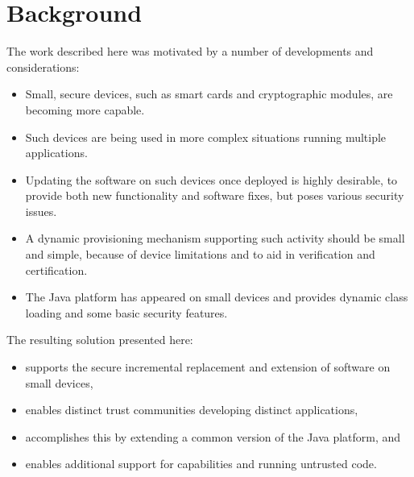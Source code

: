 \documentclass{llncs}
\begin{document}
\maketitle              %

\begin{abstract}
As small, secure devices become more powerful and more wide spread, it has become desirable
to support the dynamic provisioning and updating of multiple applications on such devices. This
paper presents a simple mechanism for performing such provisioning and updating, even if the
applications are mutually distrustful. The mechanism extends CLDC Java\texttrademark technology
with a classfile attribute that carries the certificates necessary to enable the added security.
\end{abstract}
%
\section{Background}
%
The work described here was motivated by a number of developments and considerations:
\begin{itemize}
  \item Small, secure devices, such as smart cards and cryptographic modules, are becoming more capable.
  \item Such devices are being used in more complex situations running multiple applications.
  \item Updating the software on such devices once deployed is highly desirable, to provide both new
  functionality and software fixes, but poses various security issues.
  \item A dynamic provisioning mechanism supporting such activity should be small and simple,
  because of device limitations and to aid in verification and certification.
  \item The Java platform has appeared on small devices and provides dynamic class loading and
  some basic security features.
\end{itemize}
The resulting solution presented here:

\begin{itemize}
  \item supports the secure incremental replacement and extension of software
  on small devices,
	\item  enables distinct trust communities developing
	distinct applications,
  \item accomplishes this by extending a common version of the Java platform, and
  \item enables	additional support for capabilities and running untrusted	code.
\end{itemize}
\end{document}
